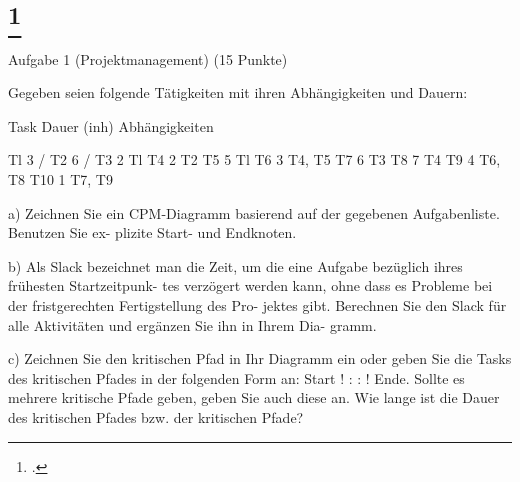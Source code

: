 \documentclass{lehramt-informatik-aufgabe}
\begin{document}
\liAufgabenTitel{}
\section{
\footcite{66116:2021:03}}

Aufgabe 1 (Projektmanagement) (15 Punkte)

Gegeben seien folgende Tätigkeiten mit ihren Abhängigkeiten und Dauern:

Task Dauer (inh) Abhängigkeiten

Tl 3 /
T2 6 /
T3 2 Tl
T4 2 T2
T5 5 Tl
T6 3 T4, T5
T7 6 T3
T8 7 T4
T9 4 T6, T8
T10 1 T7, T9

a) Zeichnen Sie ein CPM-Diagramm basierend auf der gegebenen Aufgabenliste. Benutzen Sie ex-
plizite Start- und Endknoten.

b) Als Slack bezeichnet man die Zeit, um die eine Aufgabe bezüglich ihres frühesten Startzeitpunk-
tes verzögert werden kann, ohne dass es Probleme bei der fristgerechten Fertigstellung des Pro-
jektes gibt. Berechnen Sie den Slack für alle Aktivitäten und ergänzen Sie ihn in Ihrem Dia-
gramm.

c) Zeichnen Sie den kritischen Pfad in Ihr Diagramm ein oder geben Sie die Tasks des kritischen
Pfades in der folgenden Form an: Start !  : : ! Ende. Sollte es mehrere kritische Pfade geben,
geben Sie auch diese an. Wie lange ist die Dauer des kritischen Pfades bzw. der kritischen Pfade?
\end{document}
